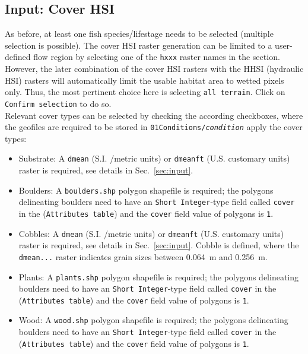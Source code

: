 \subsection{Input: Cover HSI} \label{sec:hemakecovhsi}
As before, at least one fish species/lifestage needs to be selected (multiple selection is possible). The cover HSI raster generation can be limited to a user-defined flow region by selecting one of the \texttt{hxxx} raster names in the  section. However, the later combination of the cover HSI rasters with the HHSI (hydraulic HSI) rasters will automatically limit the usable habitat area to wetted pixels only. Thus, the most pertinent choice here is selecting \texttt{all terrain}. Click on \texttt{Confirm selection} to do so.\\
Relevant cover types can be selected by checking the according checkboxes, where the geofiles are required to be stored in \texttt{01{\myUnderscore}Conditions/\textit{condition}} apply the cover types:
\begin{itemize}
	\item Substrate: A \texttt{dmean} (S.I. /metric units) or \texttt{dmean{\myUnderscore}ft} (U.S. customary units) raster is required, see details in Sec.~\ref{sec:input}.
	\item Boulders: A \texttt{boulders.shp} polygon shapefile is required; the polygons delineating boulders need to have an \texttt{Short Integer}-type field called \texttt{cover} in the (\texttt{Attributes table}) and the \texttt{cover} field value of polygons is \texttt{1}.
	\item Cobbles: A \texttt{dmean} (S.I. /metric units) or \texttt{dmean{\myUnderscore}ft} (U.S. customary units) raster is required, see details in Sec.~\ref{sec:input}. Cobble is defined, where the \texttt{dmean...} raster indicates grain sizes between 0.064~m and 0.256~m.
	\item Plants: A \texttt{plants.shp} polygon shapefile is required; the polygons delineating boulders need to have an \texttt{Short Integer}-type field called \texttt{cover} in the (\texttt{Attributes table}) and the \texttt{cover} field value of polygons is \texttt{1}.
	\item Wood: A \texttt{wood.shp} polygon shapefile is required; the polygons delineating boulders need to have an \texttt{Short Integer}-type field called \texttt{cover} in the (\texttt{Attributes table}) and the \texttt{cover} field value of polygons is \texttt{1}.	
\end{itemize}

